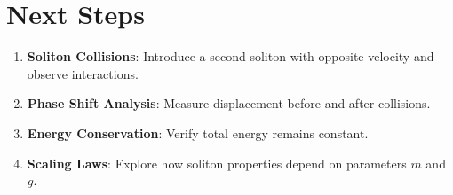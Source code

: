 \documentclass{article}
\begin{document}
\section{Next Steps}
\begin{enumerate}
    \item \textbf{Soliton Collisions}: Introduce a second soliton with opposite velocity and observe interactions.
    \item \textbf{Phase Shift Analysis}: Measure displacement before and after collisions.
    \item \textbf{Energy Conservation}: Verify total energy remains constant.
    \item \textbf{Scaling Laws}: Explore how soliton properties depend on parameters $ m $ and $ g $.
\end{enumerate}
\end{document}
